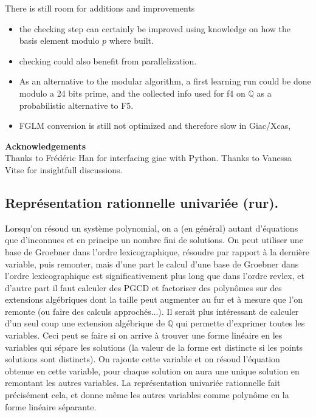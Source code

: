 \documentclass[a4paper,11pt]{article}
\begin{document}
\begin{giacjshere}
There is still room for additions and improvements
\begin{itemize}
\item the checking step can certainly be improved using
knowledge on how the basis element modulo $p$ where
built.
\item checking could also benefit from parallelization.
\item As an alternative to the modular algorithm,
a first learning run could be done modulo a 24 bits prime, and
the collected info used for f4 on $\mathbb{Q}$ as a probabilistic alternative
to F5.
\item FGLM conversion is still not optimized and therefore
slow in Giac/Xcas, 
\end{itemize}


{\bf Acknowledgements} \\
Thanks to Fr\'ed\'eric Han for interfacing giac with Python.
Thanks to Vanessa Vitse for insightfull discussions.



\subsection{Représentation rationnelle univariée 
(rur).}
\label{sec:rur}
Lorsqu'on résoud un système polynomial, on a (en général) autant
d'équations que d'inconnues et en principe un nombre fini de solutions.
On peut utiliser une base de Groebner dans l'ordre lexicographique,
résoudre par rapport à la dernière variable, puis remonter, mais
d'une part le calcul d'une base de Groebner dans l'ordre lexicographique
est significativement plus long que dans l'ordre revlex, et d'autre
part il faut calculer des PGCD et 
factoriser des polynômes sur des extensions algébriques
dont la taille peut augmenter au fur et à mesure que l'on remonte (ou faire
des calculs approchés...). Il serait plus intéressant de calculer
d'un seul coup une extension algébrique de $\mathbb{Q}$ qui permette
d'exprimer toutes les variables. Ceci peut se faire si on arrive à
trouver une forme linéaire en les variables qui sépare
les solutions (la valeur de la forme est distincte si les points
solutions sont distincts). On rajoute cette variable et on résoud
l'équation obtenue en cette variable, pour chaque solution on aura
une unique solution en remontant les autres variables. La représentation
univariée rationnelle fait précisément cela, et donne même les
autres variables comme polynôme en la forme linéaire séparante.


\end{giacjshere}
\end{document}
